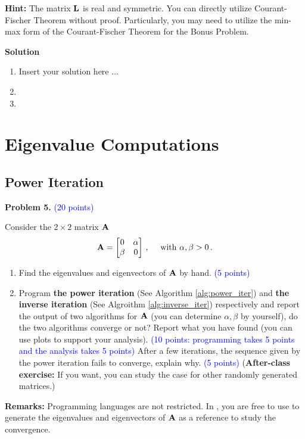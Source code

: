 \documentclass[english,onecolumn]{IEEEtran}
\newcommand{\bA}{{\bf A}}
\newcommand{\bL}{{\bf L}}
\begin{document}
\noindent\textbf{Hint:} 
The matrix $\bL$ is real and symmetric. 
	You can directly utilize Courant-Fischer Theorem without proof. Particularly, you may need to utilize the min-max form of the Courant-Fischer Theorem for the Bonus Problem.


\noindent
\textbf{Solution}
\begin{enumerate}
    \item Insert your solution here ...
    \item
    \item
\end{enumerate}


\newpage

\section{Eigenvalue Computations}
\subsection{Power Iteration} 
\noindent
\textbf{Problem 5.}
\textcolor{blue}{(20 points)}

Consider the $2\times 2$ matrix $\bA$
\[
\bA = \begin{bmatrix}
	0 & \alpha \\
	\beta & 0
\end{bmatrix}\,,\quad \text{ with }\alpha,\beta > 0\,.
\]
\begin{enumerate}
    \item Find the eigenvalues and eigenvectors of $\bA$ by hand. \textcolor{blue}{(5 points)}
    \item Program \textbf{the power iteration} (See Algorithm \ref{alg:power_iter}) and \textbf{the inverse iteration} (See Algroithm \ref{alg:inverse_iter}) respectively and report the output of two algorithms for $\bA$ (you can determine $\alpha,\beta$ by yourself), do the two algorithms converge or not? Report what you have found (you can use plots to support your analysis). \textcolor{blue}{(10 points: programming takes 5 points and the analysis takes 5 points)}
    After a few iterations, the sequence given by the power iteration fails to converge, explain why. \textcolor{blue}{(5 points)}
    (\textbf{After-class exercise:} If you want, you can study the case for other randomly generated matrices.)
\end{enumerate}
\textbf{Remarks:}
Programming languages are not restricted. In , you are free to use  to generate the eigenvalues and eigenvectors of $\bA$ as a reference to study  the convergence.
\end{document}
